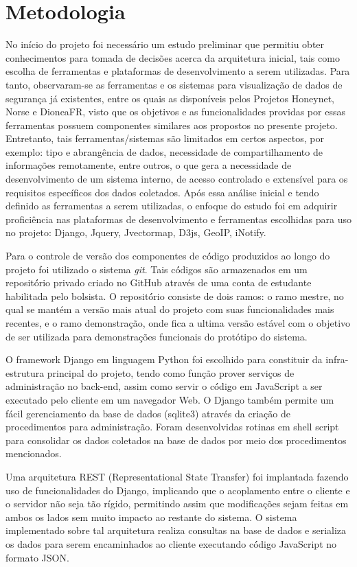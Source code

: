 \documentclass[Portuguese]
{ic-tese-v2}
\begin{document}
\chapter{Metodologia}
No início do projeto foi necessário um estudo preliminar que permitiu obter conhecimentos para tomada de decisões acerca da arquitetura inicial, tais como escolha de ferramentas e plataformas de desenvolvimento a serem utilizadas.
Para tanto, observaram-se as ferramentas e os sistemas para visualização de dados de segurança já existentes, entre os quais as disponíveis pelos Projetos Honeynet\cite{honeynet}, Norse\cite{ipviking} e DioneaFR\cite{dioneaefr}, visto que os objetivos e as funcionalidades providas por essas ferramentas possuem componentes similares aos propostos no presente projeto. Entretanto, tais ferramentas/sistemas são limitados em certos aspectos, por exemplo: tipo e abrangência de dados, necessidade de compartilhamento de informações remotamente, entre outros, o que gera a necessidade de desenvolvimento de um sistema interno, de acesso controlado e extensível para os requisitos específicos dos dados coletados.
Após essa análise inicial e tendo definido as ferramentas a serem utilizadas, o enfoque do estudo foi em adquirir proficiência nas plataformas de desenvolvimento e ferramentas escolhidas para uso no projeto: Django, Jquery, Jvectormap, D3js, GeoIP, iNotify.

Para o controle de versão dos componentes de có́digo produzidos ao longo do projeto foi utilizado o sistema \emph{git}. Tais có́digos são armazenados em um repositó́rio privado criado no GitHub através de uma conta de estudante habilitada pelo bolsista. O repositó́rio consiste de dois ramos: o ramo mestre, no qual se mantém a versão mais atual do projeto com suas funcionalidades mais recentes, e o ramo demonstração, onde fica a ultima versão estável com o objetivo de ser utilizada para demonstrações funcionais do protótipo do sistema.

O framework Django\cite{django} em linguagem Python foi escolhido para constituir da infra-estrutura principal do projeto, tendo como função prover serviços de administração no back-end, assim como servir o có́digo em JavaScript a ser executado pelo cliente em um navegador Web. O Django também permite um fácil gerenciamento da base de dados (sqlite3) através da criação de procedimentos para administração. Foram desenvolvidas rotinas em shell script para consolidar os dados coletados na base de dados por meio dos procedimentos mencionados.

Uma arquitetura REST (Representational State Transfer) foi implantada fazendo uso de funcionalidades do Django, implicando que o acoplamento entre o cliente e o servidor não seja tão rígido, permitindo assim que modificações sejam feitas em ambos os lados sem muito impacto ao restante do sistema. O sistema implementado sobre tal arquitetura realiza consultas na base de dados e serializa os dados para serem encaminhados ao cliente executando có́digo JavaScript no formato JSON.
\end{document}
